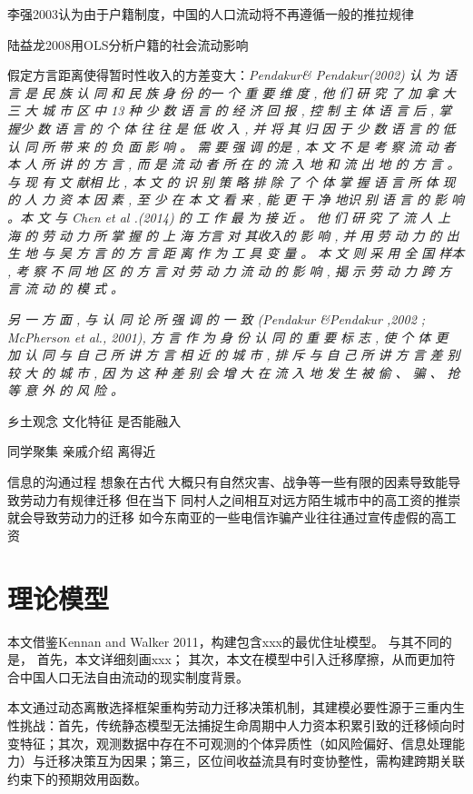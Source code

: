 \documentclass[a4paper,10pt]{article}
\begin{document}
李强2003认为由于户籍制度，中国的人口流动将不再遵循一般的推拉规律

陆益龙2008用OLS分析户籍的社会流动影响


\cite{LiuYuYunLaoDongLiKuaFangYanLiuDongDeDaoUXingMoShi2015}假定方言距离使得暂时性收入的方差变大：\textit{Pendakur\& Pendakur(2002) 认 为 语 言 是 民 族 认 同 和 民 族 身 份 的一 个 重 要 维 度 , 他 们 研 究 了 加 拿 大 三 大 城 市 区 中 13 种 少 数 语 言 的 经 济 回 报 , 控 制 主 体 语 言 后 , 掌 握少 数 语 言 的 个 体 往 往 是 低 收 入 , 并 将 其 归 因 于 少 数 语 言 的 低 认 同 所 带 来 的 负 面 影 响 。 需 要 强 调 的是 , 本 文 不 是 考 察 流 动 者 本 人 所 讲 的 方 言 , 而 是 流 动 者 所 在 的 流 入 地 和 流 出 地 的 方 言 。 与 现 有 文 献相 比 , 本 文 的 识 别 策 略 排 除 了 个 体 掌 握 语 言 所 体 现 的 人 力 资 本 因 素 , 至 少 在 本 文 看 来 , 能 更 干 净 地识 别 语 言 的 影 响 。本 文 与 Chen et al .(2014) 的 工 作 最 为 接 近 。 他 们 研 究 了 流 人 上 海 的 劳 动 力 所 掌 握 的 上 海 方言 对 其收入的 影 响 , 并 用 劳 动 力 的 出 生 地 与 吴 方 言 的 方 言 距 离 作 为 工 具 变 量 。 本 文 则 采 用 全 国 样本 , 考 察 不 同 地 区 的 方 言 对 劳 动 力 流 动 的 影 响 , 揭 示 劳 动 力 跨 方 言 流 动 的 模 式 。}

\textit{另 一 方 面 , 与 认 同 论 所 强 调 的 一 致 (Pendakur \&Pendakur ,2002 ;  McPherson et al.,  2001), 方 言 作 为 身 份 认 同 的 重 要 标 志 , 使 个 体 更 加 认 同 与 自 己 所 讲 方 言 相 近 的 城 市 , 排 斥 与 自 己 所 讲 方 言 差 别较 大 的 城 市 , 因 为 这 种 差 别 会 增 大 在 流 入 地 发 生 被 偷 、 骗 、 抢 等 意 外 的 风 险 。}

乡土观念
文化特征
是否能融入

同学聚集
亲戚介绍
离得近


信息的沟通过程
想象在古代 大概只有自然灾害、战争等一些有限的因素导致能导致劳动力有规律迁移
但在当下 同村人之间相互对远方陌生城市中的高工资的推崇就会导致劳动力的迁移
如今东南亚的一些电信诈骗产业往往通过宣传虚假的高工资



\section{理论模型}
本文借鉴Kennan and Walker 2011，构建包含xxx的最优住址模型。
与其不同的是，
首先，本文详细刻画xxx；
其次，本文在模型中引入迁移摩擦，从而更加符合中国人口无法自由流动的现实制度背景。

本文通过动态离散选择框架重构劳动力迁移决策机制，其建模必要性源于三重内生性挑战：首先，传统静态模型无法捕捉生命周期中人力资本积累引致的迁移倾向时变特征；其次，观测数据中存在不可观测的个体异质性（如风险偏好、信息处理能力）与迁移决策互为因果；第三，区位间收益流具有时变协整性，需构建跨期关联约束下的预期效用函数。
\end{document}
